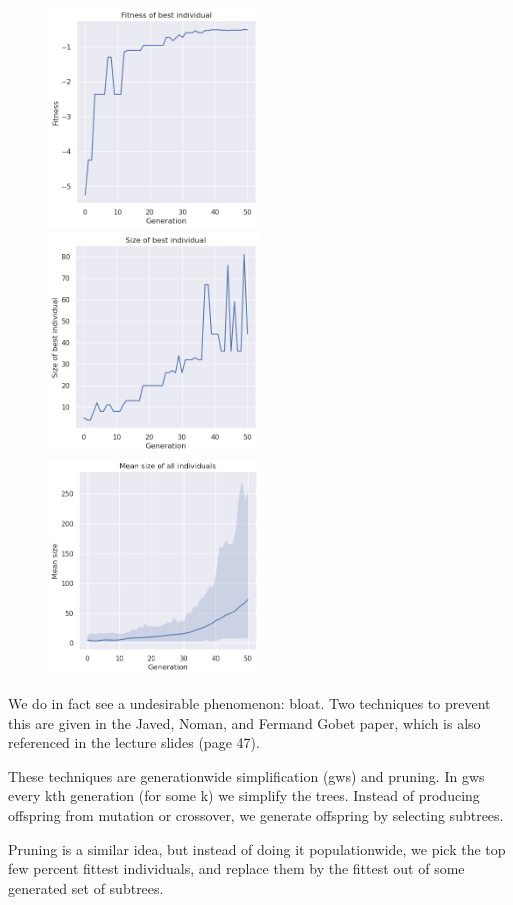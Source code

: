 \documentclass{scrartcl}
\begin{document}
\begin{figure}
  \includegraphics[width=0.5\textwidth]{8/score_best}

  \includegraphics[width=0.5\textwidth]{8/size_best}

  \includegraphics[width=0.5\textwidth]{8/mean_size}
\end{figure}

We do in fact see a undesirable phenomenon: bloat. Two techniques to
prevent this are given in the Javed, Noman, and Fermand Gobet paper, which
is also referenced in the lecture slides (page 47).

These techniques are generationwide simplification (gws) and pruning. In
gws every kth generation (for some k) we simplify the trees. Instead of
producing offspring from mutation or crossover, we generate offspring by
selecting subtrees.

Pruning is a similar idea, but instead of doing it populationwide, we pick
the top few percent fittest individuals, and replace them by the fittest
out of some generated set of subtrees.
\end{document}
